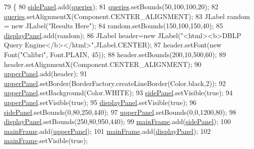 \begin{DoxyCode}
79     \{
80         \hyperlink{classGUI_a6930a3cfc244b0ce0d03e3fab60d33c7}{sidePanel}.add(\hyperlink{classGUI_ac15dd4c4cf3422b2e3ad7209b70b2df2}{queries});
81         \hyperlink{classGUI_ac15dd4c4cf3422b2e3ad7209b70b2df2}{queries}.setBounds(50,100,100,20);
82         \hyperlink{classGUI_ac15dd4c4cf3422b2e3ad7209b70b2df2}{queries}.setAlignmentX(Component.CENTER\_ALIGNMENT);
83         JLabel random = \textcolor{keyword}{new} JLabel(\textcolor{stringliteral}{"Results Here"});
84         random.setBounds(150,100,150,40);
85         \hyperlink{classGUI_aa88e747a84e0e3b6ba35371f007c8151}{displayPanel}.add(random);
86         JLabel header=\textcolor{keyword}{new} JLabel(\textcolor{stringliteral}{"<html><b>DBLP Query Engine</b></html>"},JLabel.CENTER);
87         header.setFont(\textcolor{keyword}{new} Font(\textcolor{stringliteral}{"Calibri"}, Font.PLAIN, 45));
88         header.setBounds(200,10,500,60);
89         header.setAlignmentX(Component.CENTER\_ALIGNMENT);
90         \hyperlink{classGUI_a5ae695a244b7bf0e35c5387063d0a6ae}{upperPanel}.add(header);
91         \hyperlink{classGUI_a5ae695a244b7bf0e35c5387063d0a6ae}{upperPanel}.setBorder(BorderFactory.createLineBorder(Color.black,2));
92         \hyperlink{classGUI_a5ae695a244b7bf0e35c5387063d0a6ae}{upperPanel}.setBackground(Color.WHITE);
93         \hyperlink{classGUI_a6930a3cfc244b0ce0d03e3fab60d33c7}{sidePanel}.setVisible(\textcolor{keyword}{true});
94         \hyperlink{classGUI_a5ae695a244b7bf0e35c5387063d0a6ae}{upperPanel}.setVisible(\textcolor{keyword}{true});
95         \hyperlink{classGUI_aa88e747a84e0e3b6ba35371f007c8151}{displayPanel}.setVisible(\textcolor{keyword}{true});
96         \hyperlink{classGUI_a6930a3cfc244b0ce0d03e3fab60d33c7}{sidePanel}.setBounds(0,80,250,440);
97         \hyperlink{classGUI_a5ae695a244b7bf0e35c5387063d0a6ae}{upperPanel}.setBounds(0,0,1200,80);
98         \hyperlink{classGUI_aa88e747a84e0e3b6ba35371f007c8151}{displayPanel}.setBounds(250,80,950,440);
99         \hyperlink{classGUI_ad0edd6841874d6f0d4d92b38fe4c58fa}{mainFrame}.add(\hyperlink{classGUI_a6930a3cfc244b0ce0d03e3fab60d33c7}{sidePanel});
100         \hyperlink{classGUI_ad0edd6841874d6f0d4d92b38fe4c58fa}{mainFrame}.add(\hyperlink{classGUI_a5ae695a244b7bf0e35c5387063d0a6ae}{upperPanel});
101         \hyperlink{classGUI_ad0edd6841874d6f0d4d92b38fe4c58fa}{mainFrame}.add(\hyperlink{classGUI_aa88e747a84e0e3b6ba35371f007c8151}{displayPanel});
102         \hyperlink{classGUI_ad0edd6841874d6f0d4d92b38fe4c58fa}{mainFrame}.setVisible(\textcolor{keyword}{true}); 

\end{DoxyCode}
